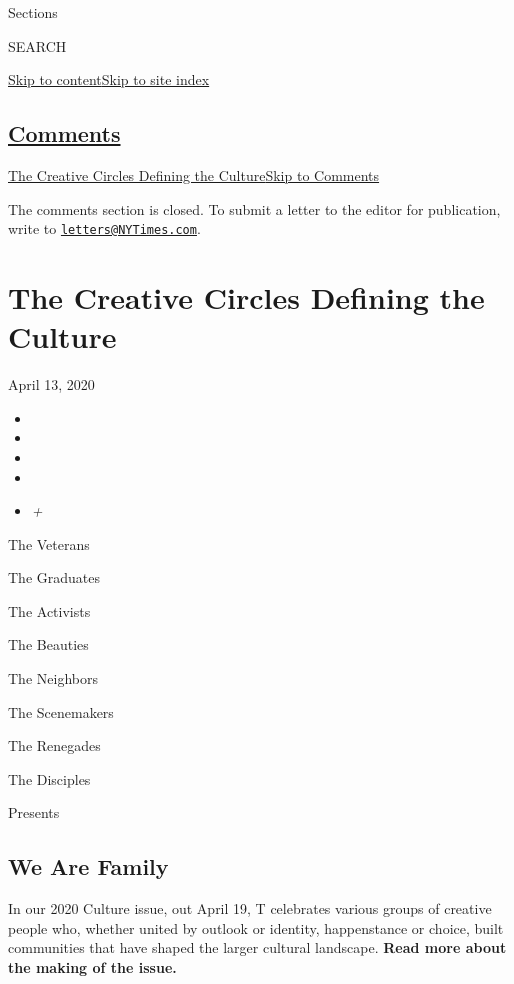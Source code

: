 Sections

SEARCH

\protect\hyperlink{site-content}{Skip to
content}\protect\hyperlink{site-index}{Skip to site index}

\hypertarget{comments}{%
\subsection{\texorpdfstring{\protect\hyperlink{commentsContainer}{Comments}}{Comments}}\label{comments}}

\href{}{The Creative Circles Defining the Culture}\href{}{Skip to
Comments}

The comments section is closed. To submit a letter to the editor for
publication, write to
\href{mailto:letters@NYTimes.com}{\nolinkurl{letters@NYTimes.com}}.

\hypertarget{the-creative-circles-defining-the-culture}{%
\section{The Creative Circles Defining the
Culture}\label{the-creative-circles-defining-the-culture}}

April 13, 2020

\begin{itemize}
\item
\item
\item
\item
\item
  \emph{+}
\end{itemize}

The Veterans

The Graduates

The Activists

The Beauties

The Neighbors

The Scenemakers

The Renegades

The Disciples

Presents

\hypertarget{we-are-family}{%
\subsection{We Are Family}\label{we-are-family}}

In our 2020 Culture issue, out April 19, T celebrates various groups of
creative people who, whether united by outlook or identity, happenstance
or choice, built communities that have shaped the larger cultural
landscape. \textbf{Read more about the making of the issue.}

